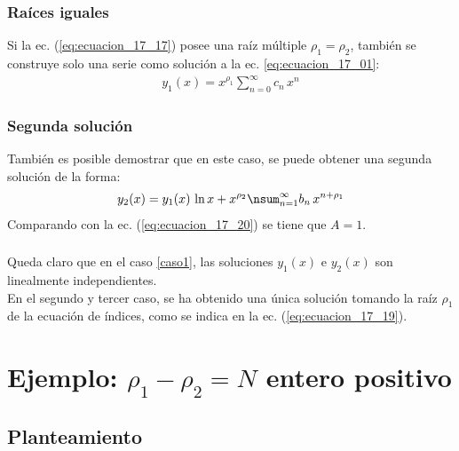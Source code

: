 \documentclass[12pt]{beamer}
\begin{document}
\begin{frame}
\frametitle{Raíces iguales}
Si la ec. (\ref{eq:ecuacion_17_17}) posee una raíz múltiple $\rho_{1} = \rho_{2}$, también se construye solo una serie como solución a la ec. \ref{eq:ecuacion_17_01}:
\pause
\begin{align*}
y_{1}(x) = x^{\rho_{1}} \sum_{n=0}^{\infty} c_{n} \, x^{n}
\end{align*}
\end{frame}
\begin{frame}
\frametitle{Segunda solución}
También es posible demostrar que en este caso, se puede obtener una segunda solución de la forma:
\pause
\begin{align}
y_{2}(x) = y_{1}(x) \, \ln x + x^{\rho_{2}} \nsum_{n=1}^{\infty} b_{n} \, x^{n+\rho_{1}}
\label{eq:ecuacion_22_Zill}
\end{align}
Comparando con la ec. (\ref{eq:ecuacion_17_20}) se tiene que $A = 1$.
\end{frame}
\begin{frame}
\frametitle{}
Queda claro que en el caso \ref{caso1}, las soluciones $y_{1}(x)$ e $y_{2}(x)$ son linealmente independientes.
\\
\bigskip
\pause
En el segundo y tercer caso, se ha obtenido una única solución tomando la raíz $\rho_{1}$ de la ecuación de índices, como se indica en la ec. (\ref{eq:ecuacion_17_19}).
\end{frame}

\section{Ejemplo: \texorpdfstring{$\rho_{1} - \rho_{2} = N$}{r1-r2=N} entero positivo}\label{ejercicio}
\subsection{Planteamiento}
\end{document}
